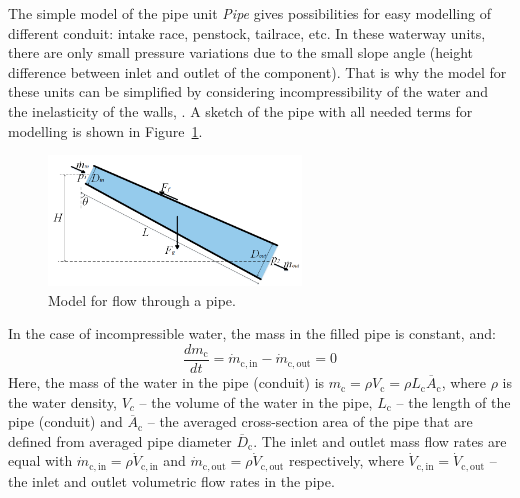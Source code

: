 \documentclass[%
]{USN-PhD}
\begin{document}
The simple model of the pipe unit \emph{Pipe} gives possibilities for easy modelling of different conduit: intake race, penstock, tailrace, etc. In these waterway units, there are only small pressure variations due to the small slope angle (height difference between inlet and outlet of the component). That is why the model for these units can be simplified by considering incompressibility of the water and the inelasticity of the walls, \cite{Vyt:17,Val:17,Sha:11}. A sketch of the pipe with all needed terms for modelling is shown in Figure~\ref{fig:fig8}.
\begin{figure}[!ht]
  \centering
 \includegraphics[width=0.6\textwidth]{fig/Fig_2_scheme}
 \caption{Model for flow through a pipe.}
  \label{fig:fig8}
\end{figure}

In the case of incompressible water, the mass in the filled pipe is constant, and:
\begin{equation}\label{eq:eq17}
\frac{dm_\mathrm{c}}{dt} = \dot{m}_\mathrm{c,in} - \dot{m}_\mathrm{c,out} = 0
\end{equation}
Here, the mass of the water in the pipe (conduit) is $m_\mathrm{c}=\rho V_\mathrm{c}=\rho L_\mathrm{c}\overline{A}_\mathrm{c}$, where $\rho$ is the water density, $V_c$ -- the volume of the water in the pipe, $L_\mathrm{c}$ -- the length of the pipe (conduit) and $\overline{A}_\mathrm{c}$ -- the averaged cross-section area of the pipe that are defined from averaged pipe diameter $\overline{D}_\mathrm{c}$. The inlet and outlet mass flow rates are equal with $\dot{m}_\mathrm{c,in}=\rho\dot{V}_\mathrm{c,in}$ and $\dot{m}_\mathrm{c,out}=\rho\dot{V}_\mathrm{c,out}$ respectively, where $\dot{V}_\mathrm{c,in}=\dot{V}_\mathrm{c,out}$ -- the inlet and outlet volumetric flow rates in the pipe.
\end{document}
